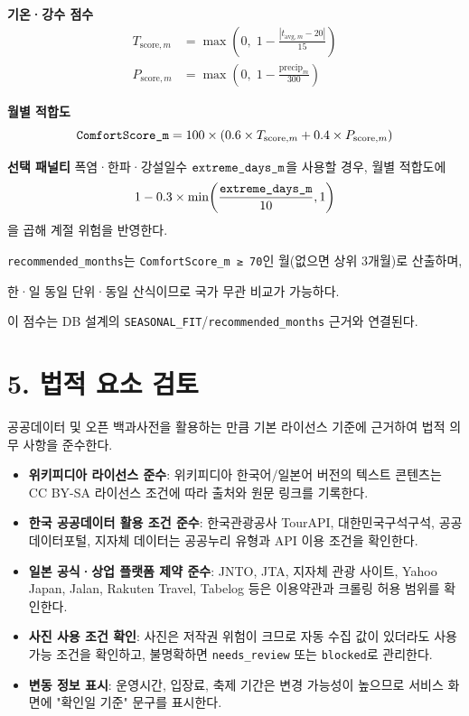 \documentclass[12pt,a4paper]{article}
\newcommand{\DocNeedspace}[1]{\par\ifdim\dimexpr\pagegoal-\pagetotal\relax<#1\newpage\fi}
\newcommand{\MetricName}[1]{\ensuremath{\text{\texttt{#1}}}}
\newcommand{\TocNoChildTight}{\vspace{-0.28em}}
\begin{document}
\DocNeedspace{16\baselineskip}
\noindent\textbf{기온·강수 점수}
\[
\begin{aligned}
T_{\mathrm{score},m} &= \max\!\left(0,\; 1 - \frac{|t_{\mathrm{avg},m} - 20|}{15}\right)\\
P_{\mathrm{score},m} &= \max\!\left(0,\; 1 - \frac{\mathrm{precip}_m}{300}\right)
\end{aligned}
\]

\DocNeedspace{12\baselineskip}
\noindent\textbf{월별 적합도}
\[
\MetricName{ComfortScore\_m}
= 100 \times
\left(0.6 \times T_{\mathrm{score},m} + 0.4 \times P_{\mathrm{score},m}\right)
\]

\DocNeedspace{10\baselineskip}
\noindent\textbf{선택 패널티}\quad
폭염·한파·강설일수 \MetricName{extreme\_days\_m}을 사용할 경우, 월별 적합도에
\[
1 - 0.3 \times \min\!\left(\frac{\MetricName{extreme\_days\_m}}{10}, 1\right)
\]
을 곱해 계절 위험을 반영한다.


\DocNeedspace{3\baselineskip}
\texttt{recommended\_\allowbreak{}months}는 \texttt{Comfort\allowbreak{}Score\_\allowbreak{}m ≥ 70}인 월(없으면 상위 3개월)로 산출하며,

\DocNeedspace{3\baselineskip}
한·일 동일 단위·동일 산식이므로 국가 무관 비교가 가능하다.

\DocNeedspace{3\baselineskip}
이 점수는 DB 설계의 \texttt{SEASONAL\_\allowbreak{}FIT}/\texttt{recommended\_\allowbreak{}months} 근거와 연결된다.


\newpage

\DocNeedspace{10\baselineskip}
\section*{5. 법적 요소 검토}
\addtocontents{toc}{\protect\TocNoChildTight}


\DocNeedspace{3\baselineskip}
공공데이터 및 오픈 백과사전을 활용하는 만큼 기본 라이선스 기준에 근거하여 법적 의무 사항을 준수한다.


\begin{itemize}
\item \textbf{위키피디아 라이선스 준수}: 위키피디아 한국어/일본어 버전의 텍스트 콘텐츠는 CC BY-SA 라이선스 조건에 따라 출처와 원문 링크를 기록한다.
\item \textbf{한국 공공데이터 활용 조건 준수}: 한국관광공사 TourAPI, 대한민국구석구석, 공공데이터포털, 지자체 데이터는 공공누리 유형과 API 이용 조건을 확인한다.
\item \textbf{일본 공식·상업 플랫폼 제약 준수}: JNTO, JTA, 지자체 관광 사이트, Yahoo Japan, Jalan, Rakuten Travel, Tabelog 등은 이용약관과 크롤링 허용 범위를 확인한다.
\item \textbf{사진 사용 조건 확인}: 사진은 저작권 위험이 크므로 자동 수집 값이 있더라도 사용 가능 조건을 확인하고, 불명확하면 \texttt{needs\_\allowbreak{}review} 또는 \texttt{blocked}로 관리한다.
\item \textbf{변동 정보 표시}: 운영시간, 입장료, 축제 기간은 변경 가능성이 높으므로 서비스 화면에 "확인일 기준" 문구를 표시한다.
\end{itemize}
\end{document}
